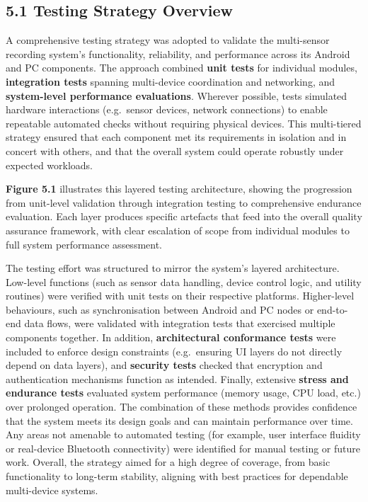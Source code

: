 \documentclass[12pt,a4paper]{article}
\begin{document}
\subsection{5.1 Testing Strategy Overview}\label{testing-strategy-overview}

A comprehensive testing strategy was adopted to validate the multi-sensor recording system's functionality, reliability, and performance across its Android and PC components. The approach combined \textbf{unit tests} for individual modules, \textbf{integration tests} spanning multi-device coordination and networking, and \textbf{system-level performance evaluations}. Wherever possible, tests simulated hardware interactions (e.g.~sensor devices, network connections) to enable repeatable automated checks without requiring physical devices. This multi-tiered strategy ensured that each component met its requirements in isolation and in concert with others, and that the overall system could operate robustly under expected workloads.

\textbf{Figure 5.1} illustrates this layered testing architecture, showing the progression from unit-level validation through integration testing to comprehensive endurance evaluation. Each layer produces specific artefacts that feed into the overall quality assurance framework, with clear escalation of scope from individual modules to full system performance assessment.

The testing effort was structured to mirror the system's layered architecture. Low-level functions (such as sensor data handling, device control logic, and utility routines) were verified with unit tests on their respective platforms. Higher-level behaviours, such as synchronisation between Android and PC nodes or end-to-end data flows, were validated with integration tests that exercised multiple components together. In addition, \textbf{architectural conformance tests} were included to enforce design constraints (e.g.~ensuring UI layers do not directly depend on data layers), and \textbf{security tests} checked that encryption and authentication mechanisms function as intended. Finally, extensive \textbf{stress and endurance tests} evaluated system performance (memory usage, CPU load, etc.) over prolonged operation. The combination of these methods provides confidence that the system meets its design goals and can maintain performance over time. Any areas not amenable to automated testing (for example, user interface fluidity or real-device Bluetooth connectivity) were identified for manual testing or future work. Overall, the strategy aimed for a high degree of coverage, from basic functionality to long-term stability, aligning with best practices for dependable multi-device systems.
\end{document}
